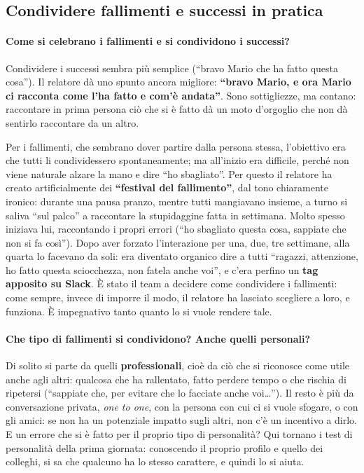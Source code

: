 \subsection{Condividere fallimenti e successi in pratica}

\paragraph{Come si celebrano i fallimenti e si condividono i successi?} Condividere i successi sembra
più semplice (``bravo Mario che ha fatto questa cosa''). Il relatore dà uno spunto ancora migliore:
\textbf{``bravo Mario, e ora Mario ci racconta come l'ha fatto e com'è andata''}. Sono sottigliezze,
ma contano: raccontare in prima persona ciò che si è fatto dà un moto d'orgoglio che non dà sentirlo
raccontare da un altro.

Per i fallimenti, che sembrano dover partire dalla persona stessa, l'obiettivo era che tutti li
condividessero spontaneamente; ma all'inizio era difficile, perché non viene naturale alzare la mano e
dire ``ho sbagliato''. Per questo il relatore ha creato artificialmente dei \textbf{``festival del
fallimento''}, dal tono chiaramente ironico: durante una pausa pranzo, mentre tutti mangiavano insieme,
a turno si saliva ``sul palco'' a raccontare la stupidaggine fatta in settimana. Molto spesso iniziava
lui, raccontando i propri errori (``ho sbagliato questa cosa, sappiate che non si fa così''). Dopo aver
forzato l'interazione per una, due, tre settimane, alla quarta lo facevano da soli: era diventato
organico dire a tutti ``ragazzi, attenzione, ho fatto questa sciocchezza, non fatela anche voi'', e c'era
perfino un \textbf{tag apposito su Slack}. È stato il team a decidere come condividere i fallimenti: come
sempre, invece di imporre il modo, il relatore ha lasciato scegliere a loro, e funziona. È impegnativo
tanto quanto lo si vuole rendere tale.

\paragraph{Che tipo di fallimenti si condividono? Anche quelli personali?} Di solito si parte da quelli
\textbf{professionali}, cioè da ciò che si riconosce come utile anche agli altri: qualcosa che ha
rallentato, fatto perdere tempo o che rischia di ripetersi (``sappiate che, per evitare che lo facciate
anche voi\dots''). Il resto è più da conversazione privata, \emph{one to one}, con la persona con cui ci
si vuole sfogare, o con gli amici: se non ha un potenziale impatto sugli altri, non c'è un incentivo a
dirlo. E un errore che si è fatto per il proprio tipo di personalità? Qui tornano i test di personalità
della prima giornata: conoscendo il proprio profilo e quello dei colleghi, si sa che qualcuno ha lo
stesso carattere, e quindi lo si aiuta.

